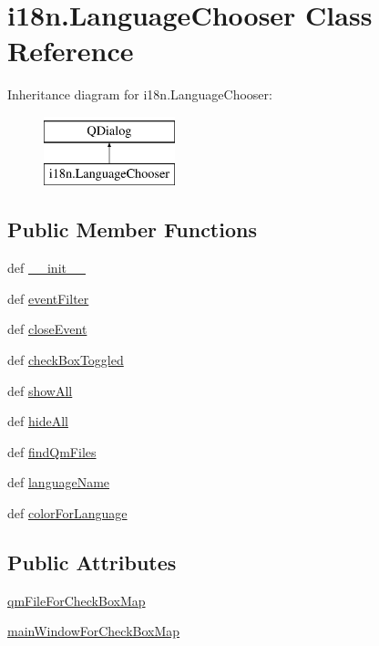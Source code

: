\hypertarget{classi18n_1_1LanguageChooser}{}\section{i18n.\+Language\+Chooser Class Reference}
\label{classi18n_1_1LanguageChooser}
Inheritance diagram for i18n.\+Language\+Chooser\+:\begin{figure}[H]
\begin{center}
\leavevmode
\includegraphics[height=2.000000cm]{classi18n_1_1LanguageChooser}
\end{center}
\end{figure}
\subsection*{Public Member Functions}
\begin{DoxyCompactItemize}
\item 
def \hyperlink{classi18n_1_1LanguageChooser_ac167634fb5c8d4d485d553abac67b0d4}{\+\_\+\+\_\+init\+\_\+\+\_\+}
\item 
def \hyperlink{classi18n_1_1LanguageChooser_a1b9f31b8979aa01c8eaec8f2fa315fe8}{event\+Filter}
\item 
def \hyperlink{classi18n_1_1LanguageChooser_abb60794ac9e2d980e0a417d69a2308b7}{close\+Event}
\item 
def \hyperlink{classi18n_1_1LanguageChooser_a4bce61d1d4854d41508a6f34bf399c49}{check\+Box\+Toggled}
\item 
def \hyperlink{classi18n_1_1LanguageChooser_a7ce617fff9e633904f1f067a0077febf}{show\+All}
\item 
def \hyperlink{classi18n_1_1LanguageChooser_a95c95c5ad91e82052c1d7705330b156f}{hide\+All}
\item 
def \hyperlink{classi18n_1_1LanguageChooser_a951a6d0c17226b8ebd94256bd1bcf101}{find\+Qm\+Files}
\item 
def \hyperlink{classi18n_1_1LanguageChooser_a0a0ad5b32a38397c7af836c8f455c24f}{language\+Name}
\item 
def \hyperlink{classi18n_1_1LanguageChooser_a7fefb7b7e0905c5b13b51ef7775fc929}{color\+For\+Language}
\end{DoxyCompactItemize}
\subsection*{Public Attributes}
\begin{DoxyCompactItemize}
\item 
\hyperlink{classi18n_1_1LanguageChooser_a1bd55c23724025de1514a5dc18b82a41}{qm\+File\+For\+Check\+Box\+Map}
\item 
\hyperlink{classi18n_1_1LanguageChooser_ac67325e1ecf9cbf7912222e2d1f44e91}{main\+Window\+For\+Check\+Box\+Map}
\end{DoxyCompactItemize}


